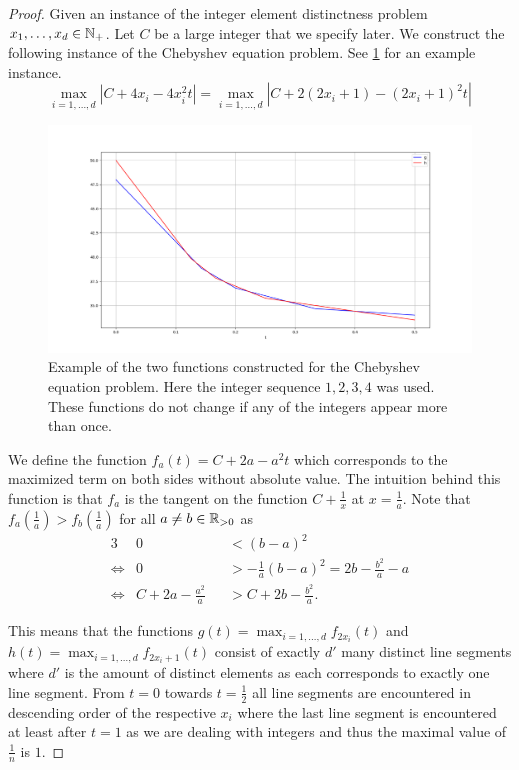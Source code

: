 \begin{proof}
	Given an instance of the integer element distinctness problem \(x_1, \dots, x_d \in \mathbb{N}_+\). Let \(C\) be a large integer that we specify later. We construct the following instance of the Chebyshev equation problem. See \cref{fig:chebyshev-eq-red} for an example instance.
	\begin{equation}\label{eq:red-eq-chebyshev}
		\max_{i=1, \dots, d} |C + 4x_i - 4x_i^2 t| = \max_{i=1, \dots, d} |C + 2(2x_i + 1) - (2x_i+1)^2 t|
	\end{equation}	

	\begin{figure}
		\centering
		\includegraphics[scale=1, width=0.9\linewidth]{figures/chebyshev-eq-red.png}
		\caption{Example of the two functions constructed for the Chebyshev equation problem. Here the integer sequence \(1, 2, 3, 4\) was used. These functions do not change if any of the integers appear more than once. }
		\label{fig:chebyshev-eq-red}
	\end{figure}


	We define the function \(f_a(t) = C + 2a - a^2 t\) which corresponds to the maximized term on both sides without absolute value. The intuition behind this function is that \(f_a\) is the tangent on the function \(C + \frac{1}{x}\) at \(x = \frac{1}{a}\). Note that \(f_a(\frac{1}{a}) > f_b(\frac{1}{a})\) for all \(a \neq b \in \mathbb{R}_{> 0}\) as 
	\begin{alignat*}{3}
		& 0 &&< (b-a)^2 \\
		\iff & 0 &&> -\frac{1}{a}(b-a)^2 =  2b -\frac{b^2}{a} - a \\
		\iff & C + 2a - \frac{a^2}{a} &&> C + 2b -\frac{b^2}{a}.
	\end{alignat*}

	This means that the functions \(g(t) = \max_{i=1,\dots, d} f_{2x_i}(t)\) and \(h(t) = \max_{i=1,\dots, d} f_{2x_i+1}(t)\) consist of exactly \(d'\) many distinct line segments where \(d'\) is the amount of distinct elements as each corresponds to exactly one line segment. From \(t=0\) towards \(t = \frac{1}{2}\) all line segments are encountered in descending order of the respective \(x_i\) where the last line segment is encountered at least after \(t=1\) as we are dealing with integers and thus the maximal value of \(\frac{1}{n}\) is \(1\). 


\end{proof}
